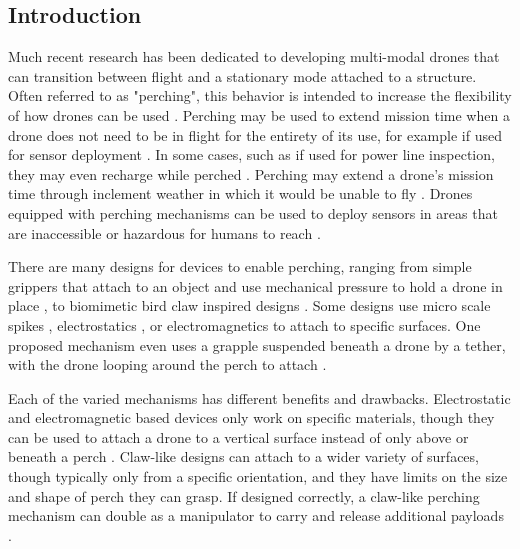 \subsection{Introduction}

Much recent research has been dedicated to developing multi-modal drones that can transition between flight
and a stationary mode attached to a structure. Often referred to as "perching", this behavior is intended
to increase the flexibility of how drones can be used \cite{meng_aerial_2022}. Perching may be used to extend 
mission time when a drone does not need to be in flight for the entirety of its use, for example if used for
sensor deployment \cite{liu_perching_2022,kirchgeorg_hedgehog_2022}. In some cases, such as if used for power line
inspection, they may even recharge while perched \cite{hoang_autonomous_2024,kitchen_design_2020}. Perching may extend
a drone's mission time through inclement weather in which it would be unable to fly \cite{liu_perching_2022}. Drones 
equipped with perching mechanisms can be used to deploy sensors in areas that are inaccessible or hazardous for 
humans to reach \cite{liu_mini-drone_2023,seiber_tracking_2018}.

There are many designs for devices to enable perching, ranging from simple grippers that attach to an object and use
mechanical pressure to hold a drone in place \cite{kirchgeorg_soft_2023,chi_optimized_2014}, to biomimetic bird claw 
inspired designs \cite{roderick_bird-inspired_2021}. Some designs use micro scale spikes \cite{roderick_bioinspired_2017}, 
electrostatics \cite{graule_perching_2016}, or electromagnetics \cite{liu_perching_2022} to attach to specific surfaces.
One proposed mechanism even uses a grapple suspended beneath a drone by a tether, with the drone looping around the 
perch to attach \cite{nguyen_passively_2019}.

Each of the varied mechanisms has different benefits and drawbacks. Electrostatic and electromagnetic based devices
only work on specific materials, though they can be used to attach a drone to a vertical surface instead of only above 
or beneath a perch \cite{meng_aerial_2022,liu_perching_2022,graule_perching_2016}. Claw-like designs can attach to a wider 
variety of surfaces, though typically only from a specific orientation, and they have limits on the size and shape of perch they can grasp. 
If designed correctly, a claw-like perching mechanism can double as a manipulator to carry 
and release additional payloads \cite{meng_aerial_2022,roderick_bird-inspired_2021}.

